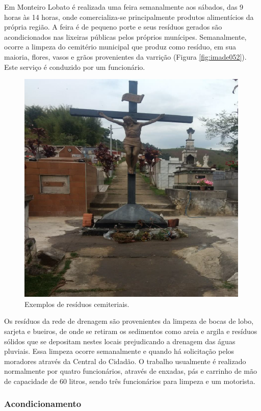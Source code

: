 	Em Monteiro Lobato é realizada uma feira semanalmente aos sábados, das 9 horas às 14 horas, onde comercializa-se principalmente produtos alimentícios da própria região. A feira é de pequeno porte e seus resíduos gerados são acondicionados nas lixeiras públicas pelos próprios munícipes. Semanalmente, ocorre a limpeza do cemitério municipal que produz como resíduo, em sua maioria, flores, vasos e grãos provenientes da varrição (Figura \ref{fig:imade052}). Este serviço é conduzido por um funcionário.
	
	\begin{figure}
		\centering
		\includegraphics[width=0.75\linewidth]{produtos/prodtres/image052}
		\caption{Exemplos de resíduos cemiteriais.}
		\label{fig:image052}
	\end{figure}

	
	Os resíduos da rede de drenagem são provenientes da limpeza de bocas de lobo, sarjeta e bueiros, de onde se retiram os sedimentos como areia e argila e resíduos sólidos que se depositam nestes locais prejudicando a drenagem das águas pluviais. Essa limpeza ocorre semanalmente e quando há solicitação pelos moradores através da Central do Cidadão. O trabalho usualmente é realizado normalmente por quatro funcionários, através de enxadas, pás e carrinho de mão de capacidade de 60 litros, sendo três funcionários para limpeza e um motorista.
	
	\subsubsection{Acondicionamento}
	
